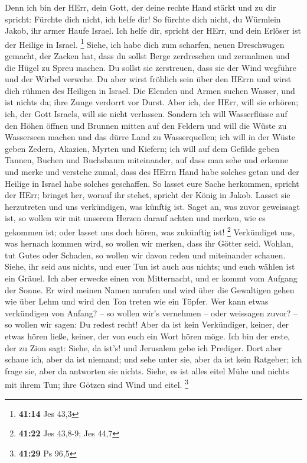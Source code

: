  Denn ich bin der HErr, dein Gott, der deine rechte Hand
stärkt und zu dir spricht: Fürchte dich nicht, ich helfe dir!
 So fürchte dich nicht, du Würmlein Jakob, ihr armer Haufe
Israel. Ich helfe dir, spricht der HErr, und dein Erlöser ist der
Heilige in Israel. \footnote{\textbf{41:14} Jes 43,3} 
Siehe, ich habe dich zum scharfen, neuen Dreschwagen gemacht, der Zacken
hat, dass du sollst Berge zerdreschen und zermalmen und die Hügel zu
Spreu machen.  Du sollst sie zerstreuen, dass sie der Wind
wegführe und der Wirbel verwehe. Du aber wirst fröhlich sein über den
HErrn und wirst dich rühmen des Heiligen in Israel.  Die
Elenden und Armen suchen Wasser, und ist nichts da; ihre Zunge verdorrt
vor Durst. Aber ich, der HErr, will sie erhören; ich, der Gott Israels,
will sie nicht verlassen.  Sondern ich will Wasserflüsse
auf den Höhen öffnen und Brunnen mitten auf den Feldern und will die
Wüste zu Wasserseen machen und das dürre Land zu Wasserquellen;
 ich will in der Wüste geben Zedern, Akazien, Myrten und
Kiefern; ich will auf dem Gefilde geben Tannen, Buchen und Buchsbaum
miteinander,  auf dass man sehe und erkenne und merke und
verstehe zumal, dass des HErrn Hand habe solches getan und der Heilige
in Israel habe solches geschaffen.  So lasset eure Sache
herkommen, spricht der HErr; bringet her, worauf ihr stehet, spricht der
König in Jakob.  Lasset sie herzutreten und uns
verkündigen, was künftig ist. Saget an, was zuvor geweissagt ist, so
wollen wir mit unserem Herzen darauf achten und merken, wie es gekommen
ist; oder lasset uns doch hören, was zukünftig ist! \footnote{\textbf{41:22}
  Jes 43,8-9; Jes 44,7}  Verkündiget uns, was hernach
kommen wird, so wollen wir merken, dass ihr Götter seid. Wohlan, tut
Gutes oder Schaden, so wollen wir davon reden und miteinander schauen.
 Siehe, ihr seid aus nichts, und euer Tun ist auch aus
nichts; und euch wählen ist ein Gräuel.  Ich aber erwecke
einen von Mitternacht, und er kommt vom Aufgang der Sonne. Er wird
meinen Namen anrufen und wird über die Gewaltigen gehen wie über Lehm
und wird den Ton treten wie ein Töpfer.  Wer kann etwas
verkündigen von Anfang? -- so wollen wir's vernehmen -- oder weissagen
zuvor? -- so wollen wir sagen: Du redest recht! Aber da ist kein
Verkündiger, keiner, der etwas hören ließe, keiner, der von euch ein
Wort hören möge.  Ich bin der erste, der zu Zion sagt:
Siehe, da ist's! und Jerusalem gebe ich Prediger.  Dort
aber schaue ich, aber da ist niemand; und sehe unter sie, aber da ist
kein Ratgeber; ich frage sie, aber da antworten sie nichts.
 Siehe, es ist alles eitel Mühe und nichts mit ihrem Tun;
ihre Götzen sind Wind und eitel. \footnote{\textbf{41:29} Ps 96,5}

